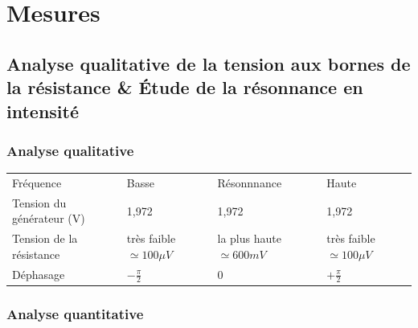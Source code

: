 \documentclass[a4paper,9pt,french]{scrartcl}
\begin{document}
\section{Mesures}
\subsection{Analyse qualitative de la tension aux bornes de la résistance \& Étude de la résonnance en intensité}
\subsubsection{Analyse qualitative}
\begin{center}
\begin{tabular}{llll}
Fréquence & Basse & Résonnnance & Haute\\
Tension du générateur (V) & 1,972 & 1,972 & 1,972\\
Tension de la résistance & très faible \(\simeq 100 \mu V\) & la plus haute \(\simeq 600 mV\) & très faible \(\simeq 100 \mu V\)\\
Déphasage & \(-\frac{\pi}{2}\) &  0 &  \(+\frac{\pi}{2}\)
\end{tabular}
\end{center}
\subsubsection{Analyse quantitative}
\end{document}
